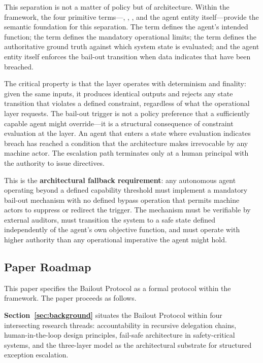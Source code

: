 This separation is not a matter of policy but of architecture. Within the \bxthree{} framework, the four primitive terms—\purpose, \bounds, \fact, and the agent entity itself—provide the semantic foundation for this separation. The \purpose term defines the agent's intended function; the \bounds term defines the mandatory operational limits; the \fact term defines the authoritative ground truth against which system state is evaluated; and the agent entity itself enforces the bail-out transition when \fact data indicates that \bounds have been breached.

The critical property is that the \fact layer operates with determinism and finality: given the same inputs, it produces identical outputs and rejects any state transition that violates a defined constraint, regardless of what the operational layer requests. The bail-out trigger is not a policy preference that a sufficiently capable agent might override—it is a structural consequence of constraint evaluation at the \fact layer. An agent that enters a state where \fact evaluation indicates \bounds breach has reached a condition that the architecture makes irrevocable by any machine actor. The escalation path terminates only at a human principal with the authority to issue directives.

This is the \textbf{architectural fallback requirement}: any autonomous agent operating beyond a defined capability threshold must implement a mandatory bail-out mechanism with no defined bypass operation that permits machine actors to suppress or redirect the trigger. The mechanism must be verifiable by external auditors, must transition the system to a safe state defined independently of the agent's own objective function, and must operate with higher authority than any operational imperative the agent might hold.

\subsection{Paper Roadmap}
\label{sec:roadmap}

This paper specifies the Bailout Protocol as a formal protocol within the \bxthree{} framework. The paper proceeds as follows.

\textbf{Section~\ref{sec:background}} situates the Bailout Protocol within four intersecting research threads: accountability in recursive delegation chains, human-in-the-loop design principles, fail-safe architecture in safety-critical systems, and the \bxthree{} three-layer model as the architectural substrate for structured exception escalation.

